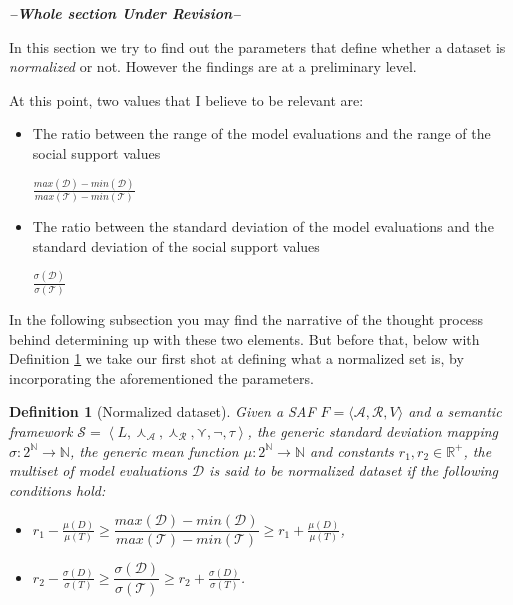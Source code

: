 \documentclass{article}
\newtheorem{definition}{Definition}
\newtheorem{example}{Example}
\newcommand{\nat}{\mathbb{N}}   %
\newcommand{\real}{\mathbb{R}}  %
\newcommand{\args}{\mathcal{A}} %
\newcommand{\att}{\mathcal{R}}  %
\newcommand{\valueset}{L}
\newcommand{\safid}{F}               %
\newcommand{\saf}{\safid = \safbody} %
\newcommand{\safbody}{\langle \args, \att, V \rangle} %
\newcommand{\sembodyNew}{\left\langle \valueset,\SAFand_\mathcal{A}, \SAFand_\mathcal{R},\SAFor,\lnot,\tau \right\rangle} %
\newcommand{\SAFand}{\curlywedge}     %
\newcommand{\SAFor}{\curlyvee}        %
\newcommand{\sem}{\mathcal{S}}
\newcommand{\dataset}{\mathcal{D}}   %
\newcommand{\ssset}{\mathcal{T}}   %
\begin{document}
\textbf{\emph{--Whole section Under Revision--}}

In this section we try to find out the parameters that define whether a dataset is \textit{normalized} or not. However the findings are at a preliminary level.

At this point, two values that I believe to be relevant are:
\begin{itemize}
\item The ratio between the range of the model evaluations and the range of the social support values

\begin{center}
 $\frac{max(\dataset) - min(\dataset)}{max(\ssset) - min(\ssset)}$
\end{center}
\item The ratio between the standard deviation of the model evaluations and the standard deviation of the social support values

\begin{center}
$\frac{\sigma(\dataset)}{\sigma(\ssset)}$
\end{center}
\end{itemize}

In the following subsection you may find the narrative of the thought process behind determining up with these two elements. But before that, below with Definition \ref{def:normSet} we take our first shot at defining what a normalized set is, by incorporating the aforementioned the parameters.


\begin{definition} [Normalized dataset]
\label{def:normSet}  
Given a SAF $\saf$ and a semantic framework $\sem = \sembodyNew$, the generic standard deviation mapping $\sigma: 2^{\nat} \rightarrow \nat$, the generic mean function $\mu: 2^{\nat} \rightarrow \nat$  and constants $r_1,  r_2 \in \real^+$, the multiset of model evaluations $\dataset$ is said to be normalized dataset if the following conditions hold:
\begin{itemize}
\item $r_1 - \frac{\mu(D)}{\mu(T)} \geq \dfrac{max(\dataset) - min(\dataset)}{max(\ssset) - min(\ssset)} \geq r_1 + \frac{\mu(D)}{\mu(T)}$, 
\item   $r_2 - \frac{\sigma(D)}{\sigma(T)} \geq \dfrac{\sigma(\dataset)}{\sigma(\ssset)} \geq r_2 + \frac{\sigma(D)}{\sigma(T)}$.
\end{itemize}
\end{definition}

\begin{comment}
\begin{example}
Let $\saf$ be a SAF, $\sem = \sembodyNew$ a semantic framework, $\args =\{a_1, a_2, a_3\}$ and $\att =\{\}.$
\end{example}
\end{comment}
\end{document}
